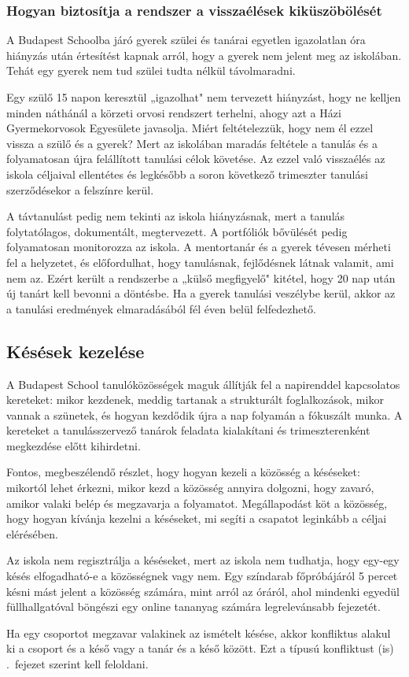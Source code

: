 \hypertarget{hogyan-biztositja-a-rendszer-a-visszaelesek-kikuszoboleset}{%
\subsubsection{Hogyan biztosítja a rendszer a visszaélések
kiküszöbölését}\label{hogyan-biztositja-a-rendszer-a-visszaelesek-kikuszoboleset}}

A Budapest Schoolba járó gyerek szülei és tanárai egyetlen igazolatlan
óra hiányzás után értesítést kapnak arról, hogy a gyerek nem jelent meg
az iskolában. Tehát egy gyerek nem tud szülei tudta nélkül távolmaradni.

Egy szülő 15 napon keresztül „igazolhat" nem tervezett hiányzást, hogy
ne kelljen minden náthánál a körzeti orvosi rendszert terhelni, ahogy
azt a Házi Gyermekorvosok Egyesülete javasolja. Miért feltételezzük,
hogy nem él ezzel vissza a szülő és a gyerek? Mert az iskolában maradás
feltétele a tanulás és a folyamatosan újra felállított tanulási célok
követése. Az ezzel való visszaélés az iskola céljaival ellentétes és
legkésőbb a soron következő trimeszter tanulási szerződésekor a
felszínre kerül.

A távtanulást pedig nem tekinti az iskola hiányzásnak, mert a tanulás
folytatólagos, dokumentált, megtervezett. A portfóliók bővülését pedig
folyamatosan monitorozza az iskola. A mentortanár és a gyerek tévesen
mérheti fel a helyzetet, és előfordulhat, hogy tanulásnak, fejlődésnek
látnak valamit, ami nem az. Ezért került a rendszerbe a „külső
megfigyelő" kitétel, hogy 20 nap után új tanárt kell bevonni a döntésbe.
Ha a gyerek tanulási veszélybe kerül, akkor az a tanulási eredmények
elmaradásából fél éven belül felfedezhető.

\hypertarget{kesesek-kezelese}{%
\subsection{Késések kezelése}\label{kesesek-kezelese}}

A Budapest School tanulóközösségek maguk állítják fel a napirenddel
kapcsolatos kereteket: mikor kezdenek, meddig tartanak a strukturált
foglalkozások, mikor vannak a szünetek, és hogyan kezdődik újra a nap
folyamán a fókuszált munka. A kereteket a tanulásszervező tanárok
feladata kialakítani és trimeszterenként megkezdése előtt kihirdetni.

Fontos, megbeszélendő részlet, hogy hogyan kezeli a közösség a
késéseket: mikortól lehet érkezni, mikor kezd a közösség annyira
dolgozni, hogy zavaró, amikor valaki belép és megzavarja a folyamatot.
Megállapodást köt a közösség, hogy hogyan kívánja kezelni a késéseket,
mi segíti a csapatot leginkább a céljai elérésében.

Az iskola nem regisztrálja a késéseket, mert az iskola nem tudhatja,
hogy egy-egy késés elfogadható-e a közösségnek vagy nem. Egy színdarab
főpróbájáról 5 percet késni mást jelent a közösség számára, mint arról
az óráról, ahol mindenki egyedül füllhallgatóval böngészi egy online
tananyag számára legrelevánsabb fejezetét.

Ha egy csoportot megzavar valakinek az ismételt késése, akkor konfliktus
alakul ki a csoport és a késő vagy a tanár és a késő között. Ezt a
típusú konfliktust (is) .~fejezet szerint kell feloldani.
